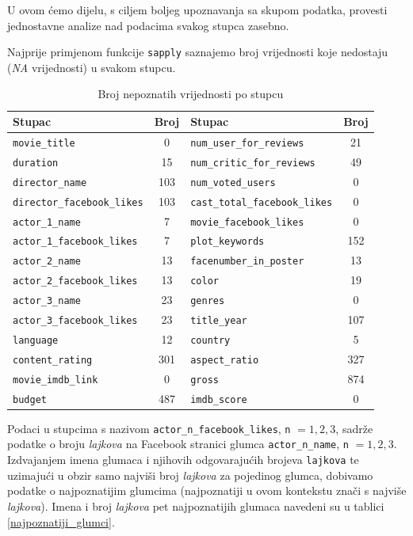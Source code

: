 	 U ovom ćemo dijelu, s ciljem boljeg upoznavanja sa skupom podatka, provesti jednostavne analize nad podacima svakog stupca zasebno. 
	 
	 Najprije primjenom funkcije \texttt{sapply} saznajemo broj vrijednosti koje nedostaju (\textit{NA} vrijednosti) u svakom stupcu.
	 
	 \begin{table}[H]
	 	\centering
	 	\caption{Broj nepoznatih vrijednosti po stupcu}
	 	\label{missing-values}
	 	\begin{tabular}{|l|c|l|c|}
	 		\hline
	 		\textbf{Stupac} & \textbf{Broj} & \textbf{Stupac} & \textbf{Broj} \\
	 		\hline
	 		\texttt{movie\_title} & 0 & \texttt{num\_user\_for\_reviews} & 21 \\
	 		\hline
	 		\texttt{duration} & 15 & \texttt{num\_critic\_for\_reviews} & 49 \\
	 		\hline
	 		\texttt{director\_name} & 103 & \texttt{num\_voted\_users} & 0 \\
	 		\hline
	 		\texttt{director\_facebook\_likes} & 103 & \texttt{cast\_total\_facebook\_likes} & 0 \\
	 		\hline
	 		\texttt{actor\_1\_name} & 7 & \texttt{movie\_facebook\_likes} & 0 \\
	 		\hline
	 		\texttt{actor\_1\_facebook\_likes} & 7 & \texttt{plot\_keywords} & 152 \\
	 		\hline
	 		\texttt{actor\_2\_name} & 13 & \texttt{facenumber\_in\_poster} & 13 \\
	 		\hline
	 		\texttt{actor\_2\_facebook\_likes} & 13 & \texttt{color} & 19 \\
	 		\hline
	 		\texttt{actor\_3\_name} & 23 & \texttt{genres} & 0 \\
	 		\hline
	 		\texttt{actor\_3\_facebook\_likes} & 23 & \texttt{title\_year} & 107 \\
	 		\hline
	 		\texttt{language} & 12 & \texttt{country} & 5 \\
	 		\hline
	 		\texttt{content\_rating} & 301 & \texttt{aspect\_ratio} & 327 \\
	 		\hline
	 		\texttt{movie\_imdb\_link} & 0 & \texttt{gross} & 874 \\
	 		\hline
	 		\texttt{budget} & 487 & \texttt{imdb\_score} & 0 \\
	 		\hline
	 	\end{tabular}
	 \end{table}
	 
	 Podaci u stupcima s nazivom \texttt{actor\_n\_facebook\_likes}, \texttt{n} $= 1, 2, 3$,  sadrže podatke o broju \textit{lajkova} na Facebook stranici glumca \texttt{actor\_n\_name}, \texttt{n} $= 1, 2, 3$. Izdvajanjem imena glumaca i njihovih odgovarajućih brojeva \texttt{lajkova} te uzimajući u obzir samo najviši broj \textit{lajkova} za pojedinog glumca, dobivamo podatke o najpoznatijim glumcima (najpoznatiji u ovom kontekstu znači s najviše \textit{lajkova}). Imena i broj \textit{lajkova} pet najpoznatijih glumaca navedeni su u tablici \ref{najpoznatiji_glumci}. 
	 
